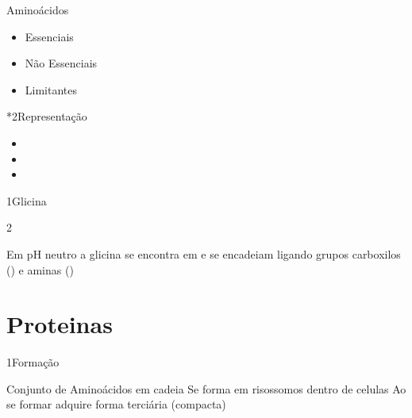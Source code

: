 \documentclass[\mainfilename]{subfiles}
\begin{document}


\begin{sectionBox}{Aminoácidos}
    
    \begin{itemize}
        \item Essenciais
        \item Não Essenciais
        \item Limitantes
    \end{itemize}

    \begin{sectionBox}*2{Representação}
        
        \begin{itemize}
            \item {}
            \item {}
            \item {}
        \end{itemize}
        
    \end{sectionBox}
    
\end{sectionBox}

\begin{sectionBox}1{Glicina}
    

    \begin{sectionBox}2{}
        
        Em pH neutro a glicina se encontra em  e se encadeiam ligando grupos carboxilos () e aminas ()
        
    \end{sectionBox}
    
\end{sectionBox}

\part*{Proteinas}

\begin{sectionBox}1{Formação}
    
    Conjunto de Aminoácidos em cadeia
    Se forma em risossomos dentro de celulas
    Ao se formar adquire forma terciária (compacta)

    
\end{sectionBox}
\end{document}
